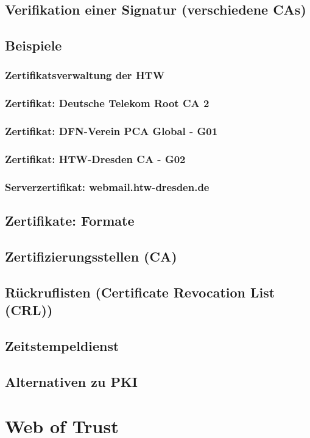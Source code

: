 \subsection{Verifikation einer Signatur (verschiedene CAs)}
\subsection{Beispiele}
\subsubsection{Zertifikatsverwaltung der HTW}
\subsubsection{Zertifikat: Deutsche Telekom Root CA 2}
\subsubsection{Zertifikat: DFN-Verein PCA Global - G01}
\subsubsection{Zertifikat: HTW-Dresden CA - G02}
\subsubsection{Serverzertifikat: webmail.htw-dresden.de}
\subsection{Zertifikate: Formate}
\subsection{Zertifizierungsstellen (CA)}
\subsection{Rückruflisten (Certificate Revocation List (CRL))}
\subsection{Zeitstempeldienst}
\subsection{Alternativen zu PKI}

\section{Web of Trust}












